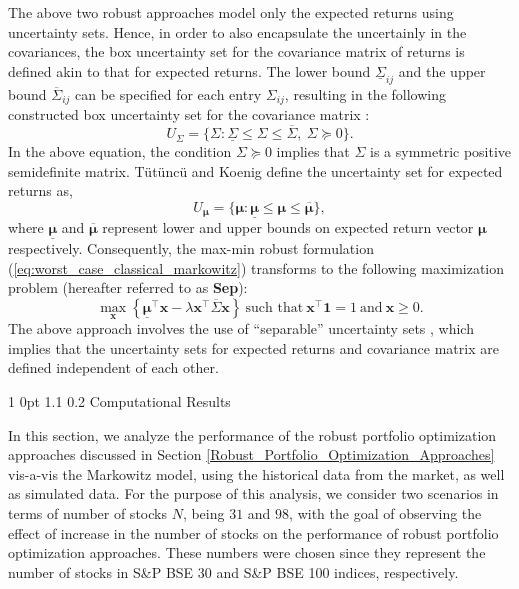 \documentclass[12pt]{article}
\makeatletter
\numberwithin{equation}{section}
\renewcommand{\section}{
  \@startsection
  {section}%
  {1}%
  {0pt}%
  {1.1\baselineskip}%
  {0.2\baselineskip}%
  {\sc \centering}%
}
\makeatother
\begin{document}
The above two robust approaches model only the expected returns using uncertainty sets. Hence, in order to also encapsulate the uncertainly in the covariances, the box uncertainty set for the covariance matrix of returns is defined akin to that for expected returns. The lower bound $\underline{\Sigma}_{ij}$ and the upper bound $\overline{\Sigma}_{ij}$ can be specified for each entry $\Sigma_{ij}$, resulting in the following constructed box uncertainty set for the covariance matrix \cite{Tutuncu04}:
\begin{equation}
\label{eqn:separable_1}
U_{\Sigma}=\{\Sigma: \underline{\Sigma} \leq \Sigma \leq \overline{\Sigma},~\Sigma \succeq 0\}.
\end{equation}
In the above equation, the condition $\Sigma \succeq 0$ implies that $\Sigma$ is a symmetric positive semidefinite matrix. T{\"u}t{\"u}nc{\"u} and Koenig \cite{Tutuncu04} define the uncertainty set for expected returns as,
\begin{equation}
\label{eqn:separable_2}
U_{\boldsymbol{\mu}}=\{\boldsymbol{\mu}:\underline{\boldsymbol{\mu}}\leq\boldsymbol{\mu}\leq\overline{\boldsymbol{\mu}}\},
\end{equation}
where $\underline{\boldsymbol{\mu}}$ and $\overline{\boldsymbol{\mu}}$ represent lower and upper bounds on expected return vector $\boldsymbol{\mu}$ respectively. Consequently, the max-min robust formulation (\ref{eq:worst_case_classical_markowitz}) transforms to the following maximization problem (hereafter referred to as \textbf{Sep}):
\begin{equation}
\label{eqn:separable_markowitz}
\max_{\mathbf{x}} \left\{\underline{\boldsymbol{\mu}}^{\top}\mathbf{x}-\lambda \mathbf{x^{\top}}\overline{\Sigma}\mathbf{x}\right\}~\text{such that}~ \mathbf{x^{\top}}\mathbf{1}=1~\text{and}~\mathbf{x}\geq 0.
\end{equation}
The above approach involves the use of ``separable'' uncertainty sets \cite{Lu06}, which implies that the uncertainty sets for expected returns and covariance matrix are defined independent of each other.

\section{Computational Results}
\label{Computational_Results}

In this section, we analyze the performance of the robust portfolio optimization approaches discussed in Section \ref{Robust_Portfolio_Optimization_Approaches} vis-a-vis the Markowitz model, using the historical data from the market, as well as simulated data. For the purpose of this analysis, we consider two scenarios in terms of number of stocks $N$, being $31$ and $98$, with the goal of observing the effect of increase in the number of stocks on the performance of robust portfolio optimization approaches. These numbers were chosen since they represent the number of stocks in S\&P BSE 30 and S\&P BSE 100 indices, respectively.
\end{document}
